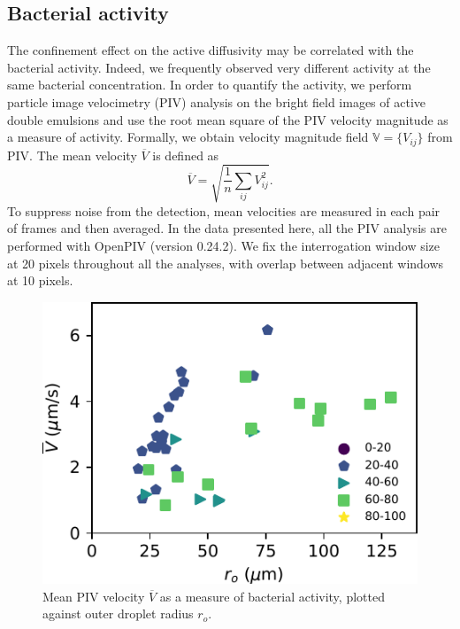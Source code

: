 \documentclass[%
10pt,
superscriptaddress,
twocolumn,
 amsmath,amssymb,
 aps,prx,
]{revtex4-2}
\begin{document}
\subsection{Bacterial activity}

The confinement effect on the active diffusivity may be correlated with the bacterial activity.
Indeed, we frequently observed very different activity at the same bacterial concentration.
In order to quantify the activity, we perform particle image velocimetry (PIV) analysis on the bright field images of active double emulsions and use the root mean square of the PIV velocity magnitude as a measure of activity.
Formally, we obtain velocity magnitude field $\mathbb{V}=\{V_{ij}\}$ from PIV.
The mean velocity $\overline V$ is defined as
%
\begin{equation}
    \overline V = \sqrt{\frac{1}{n}\sum_{ij} V_{ij}^2}.
\end{equation}
%
To suppress noise from the detection, mean velocities are measured in each pair of frames and then averaged. In the data presented here, all the PIV analysis are performed with OpenPIV (version 0.24.2). We fix the interrogation window size at 20 pixels throughout all the analyses, with overlap between adjacent windows at 10 pixels.

\begin{figure}[!t]
  \includegraphics[width=\columnwidth]{bacterial-activity}
  \caption{
  Mean PIV velocity $\overline V$ as a measure of bacterial activity, plotted against outer droplet radius $r_o$.
  }
  \label{fig:bacterial-activity}
\end{figure}
\end{document}
